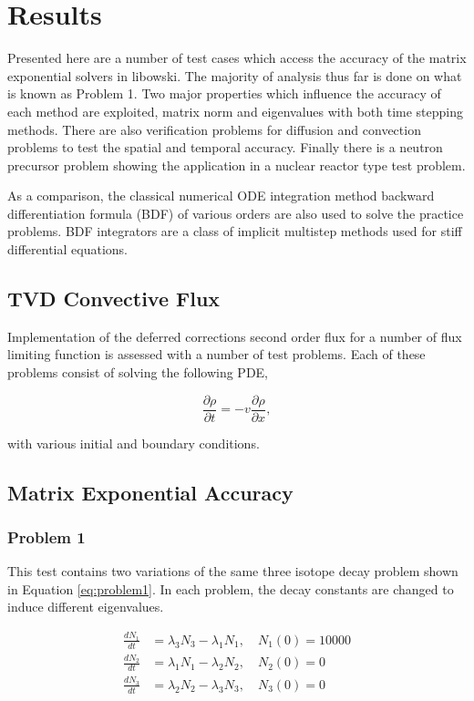 \chapter{Results}\label{ch:results}
Presented here are a number of test cases which access the accuracy of the matrix exponential solvers in libowski. The majority of analysis thus far is done on what is known as Problem 1. Two major properties which influence the accuracy of each method are exploited, matrix norm and eigenvalues with both time stepping methods. There are also verification problems for diffusion and convection problems to test the spatial and temporal accuracy. Finally there is a neutron precursor problem showing the application in a nuclear reactor type test problem. 

As a comparison, the classical numerical ODE integration method backward differentiation formula (BDF) of various orders are also used to solve the practice problems. BDF integrators are a class of implicit multistep methods used for stiff differential equations. 

\section{TVD Convective Flux}
Implementation of the deferred corrections second order flux for a number of flux limiting function is assessed with a number of test problems. Each of these problems consist of solving the following PDE,

\begin{equation}
    \frac{\partial \rho}{\partial t} = -v\frac{\partial \rho}{\partial x},
\end{equation}

\noindent with various initial and boundary conditions. 

\section{Matrix Exponential Accuracy}
\subsection{Problem 1}
This test contains two variations of the same three isotope decay problem shown in Equation \ref{eq:problem1}. In each problem, the decay constants are changed to induce different eigenvalues.

\begin{equation}
\begin{split}
    \frac{dN_{1}}{dt} &= \lambda_{3}N_{3} - \lambda_{1}N_{1}, \quad N_{1}(0) = 10000\\
    \frac{dN_{2}}{dt} &= \lambda_{1}N_{1} - \lambda_{2}N_{2}, \quad N_{2}(0) = 0\\
    \frac{dN_{3}}{dt} &= \lambda_{2}N_{2} - \lambda_{3}N_{3}, \quad N_{3}(0) = 0
\end{split}
    \label{eq:problem1}
\end{equation}

